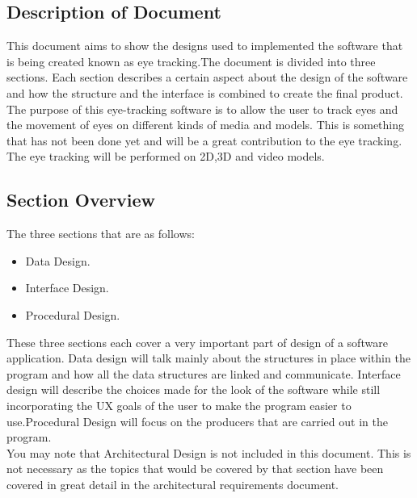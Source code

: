 \subsection{Description of Document}
This document aims to show the designs used to implemented the software that is being created known as eye tracking.The document is divided into three sections. Each section describes a certain aspect about the design of the software and how the structure and the interface is combined to create the final product.
The purpose of this eye-tracking software is to allow the user to track eyes and the movement of eyes on different kinds of media and models. This is something that has not been done yet and will be a great contribution to the eye tracking. The eye tracking will be performed on 2D,3D and video models.
\subsection{Section Overview }
The three sections that are as follows:
\begin{itemize}
\item Data Design.
\item Interface Design.
\item Procedural Design.
\end{itemize}
These three sections each cover a very important part of design of a software application. Data design will talk mainly about the structures in place within the program and how all the data structures are linked and communicate. Interface design will describe the choices made for the look of the software while still incorporating the UX goals of the user to make the program easier to use.Procedural Design will focus on the producers that are carried out in the program.\\
You may note that Architectural Design is not included in this document. This is not necessary as the topics that would be covered by that section have been covered in great detail in the architectural requirements document.